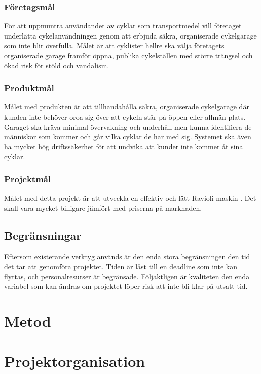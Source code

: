 \documentclass[a4paper]{article}
\begin{document}
\subsubsection{Företagsmål}
För att uppmuntra användandet av cyklar som transportmedel vill företaget underlätta cykelanvändningen
 genom att erbjuda säkra, organiserade cykelgarage som inte blir överfulla. Målet är att cyklister hellre
 ska välja företagets organiserade garage framför öppna, publika cykelställen med större trängsel och
 ökad risk för stöld och vandalism.

\subsubsection{Produktmål}
Målet med produkten är att tillhandahålla säkra, organiserade cykelgarage där kunden inte behöver oroa 
sig över att cykeln står på öppen eller allmän plats. Garaget ska kräva minimal övervakning och underhåll men 
kunna identifiera de människor som kommer och går vilka cyklar de har med sig. Systemet ska även ha mycket 
hög driftssäkerhet för att undvika att kunder inte kommer åt sina cyklar.

\subsubsection{Projektmål}
Målet med detta projekt är att utveckla en effektiv och  lätt Ravioli maskin . 
Det skall vara mycket  billigare jämfört med priserna på marknaden. 

\subsection{Begränsningar} %
Eftersom existerande verktyg används är den enda stora begränsningen den tid det tar att genomföra 
projektet. Tiden är låst till en deadline som inte kan flyttas, och personalresurser är begränsade. 
Följaktligen är kvaliteten den enda variabel som kan ändras om projektet löper risk att inte bli klar 
på utsatt tid.


\section{Metod}

\section{Projektorganisation} %
\end{document}
